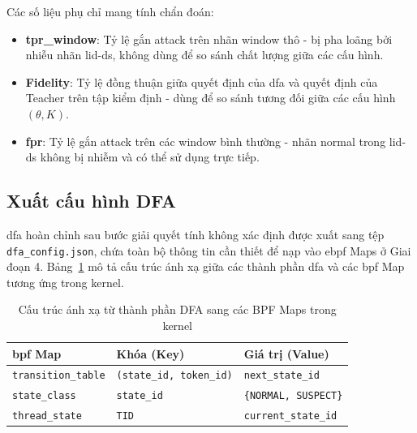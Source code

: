 \documentclass[../main.tex]{subfiles}
\begin{document}
Các số liệu phụ chỉ mang tính chẩn đoán:
\begin{itemize}
  \item \textbf{\gls{tpr}\_window}: Tỷ lệ gắn attack trên nhãn window thô -
    bị pha loãng bởi
    nhiễu nhãn \gls{lid-ds}, không dùng để so sánh chất lượng giữa các cấu hình.
  \item \textbf{Fidelity}: Tỷ lệ đồng thuận giữa quyết định của \gls{dfa}
    và quyết định của
    Teacher trên tập kiểm định - dùng để so sánh tương đối giữa các
    cấu hình $(\theta,
    K)$.
  \item \textbf{\gls{fpr}}: Tỷ lệ gắn attack trên các window bình thường -
    nhãn normal trong
    \gls{lid-ds} không bị nhiễm và có thể sử dụng trực tiếp.
\end{itemize}

\subsection{Xuất cấu hình DFA}
\label{sec:dfa_export}

\gls{dfa} hoàn chỉnh sau bước giải quyết tính không xác định được xuất sang tệp
\texttt{dfa\_config.json}, chứa toàn bộ thông tin cần thiết để nạp
vào \gls{ebpf} Maps ở Giai
đoạn 4. Bảng~\ref{tab:bpf_maps} mô tả cấu trúc ánh xạ giữa các thành
phần \gls{dfa} và các
\gls{bpf} Map tương ứng trong kernel.

\begin{table}[H]
  \caption{Cấu trúc ánh xạ từ thành phần DFA sang các BPF Maps trong kernel}
  \label{tab:bpf_maps}
  \centering
  \small
  \setlength{\tabcolsep}{4pt}
  \begin{tabular}{|
      >{\raggedright\arraybackslash}p{}|
      >{\centering\arraybackslash}p{}|
    >{\centering\arraybackslash}p{}|}
    \hline
    \textbf{\gls{bpf} Map} & \textbf{Khóa (Key)} & \textbf{Giá trị
    (Value)} \\ \hline
    \texttt{transition\_table} & \texttt{(state\_id, token\_id)} &
    \texttt{next\_state\_id} \\ \hline
    \texttt{state\_class} & \texttt{state\_id} &
    \texttt{\{NORMAL, SUSPECT\}} \\ \hline
    \texttt{thread\_state} & \texttt{TID} &
    \texttt{current\_state\_id} \\ \hline
  \end{tabular}
\end{table}
\end{document}
